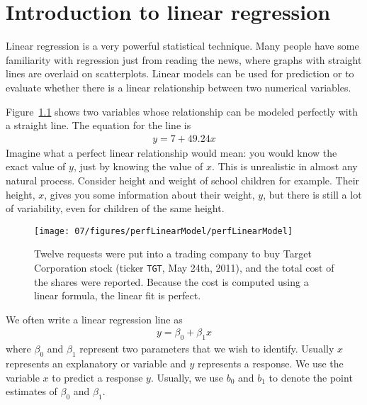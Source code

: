 \chapter{Introduction to linear regression}
\label{linRegrForTwoVar}

Linear regression is a very powerful statistical technique. Many people have some familiarity with regression just from reading the news, where graphs with straight lines are overlaid on scatterplots. Linear models can be used for prediction or to evaluate whether there is a linear relationship between two numerical variables.

Figure~\ref{perfLinearModel} shows two variables whose relationship can be modeled perfectly with a straight line. The equation for the line is
\begin{eqnarray*}
y = 7 + 49.24x
\end{eqnarray*}
Imagine what a perfect linear relationship would mean: you would know the exact value of $y$, just by knowing the value of $x$. This is unrealistic in almost any natural process. Consider height and weight of school children for example. Their height, $x$, gives you some information about their weight, $y$, but there is still a lot of variability, even for children of the same height. 
\begin{figure}
   \centering
   \texttt{[image: 07/figures/perfLinearModel/perfLinearModel]}
   \caption{Twelve requests were put into a trading company to buy Target Corporation stock (ticker \texttt{TGT}, May 24th, 2011), and the total cost of the shares were reported. Because the cost is computed using a linear formula, the linear fit is perfect.}
   \label{perfLinearModel}
\end{figure}

We often write a linear regression line as
\begin{eqnarray*}
y = \beta_0 + \beta_1x
\end{eqnarray*}
where $\beta_0$ and $\beta_1$ represent two parameters that we wish to identify. Usually $x$ represents an explanatory or  variable and $y$ represents a response. We use the variable $x$ to predict a response $y$. Usually, we use $b_0$ and $b_1$ to denote the point estimates of $\beta_0$ and $\beta_1$.

